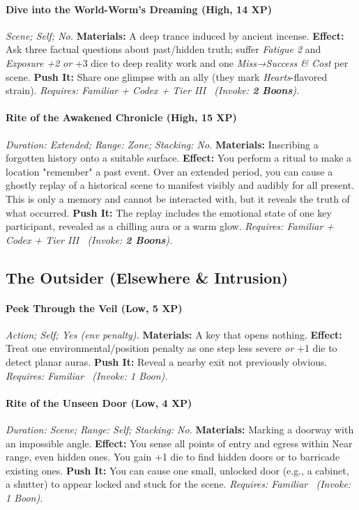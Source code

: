 \documentclass[12pt,twoside]{book}
\begin{document}
\paragraph{Dive into the World-Worm’s Dreaming (High, 14 XP)} \emph{Scene; Self; No.}
\textbf{Materials:} A deep trance induced by ancient incense.
\textbf{Effect:} Ask three factual questions about past/hidden truth; suffer \emph{Fatigue 2} and \emph{Exposure +2} \emph{or} +3 dice to deep reality work and one \emph{Miss→Success \& Cost} per scene.
\textbf{Push It:} Share one glimpse with an ally (they mark \emph{Hearts}-flavored strain).
\emph{Requires: Familiar + Codex + Tier III \ (\textit{Invoke:} \textbf{2 Boons}).}
\paragraph{Rite of the Awakened Chronicle (High, 15 XP)} \emph{Duration: Extended; Range: Zone; Stacking: No.}
\textbf{Materials:} Inscribing a forgotten history onto a suitable surface.
\textbf{Effect:} You perform a ritual to make a location "remember" a past event. Over an extended period, you can cause a ghostly replay of a historical scene to manifest visibly and audibly for all present. This is only a memory and cannot be interacted with, but it reveals the truth of what occurred.
\textbf{Push It:} The replay includes the emotional state of one key participant, revealed as a chilling aura or a warm glow.
\emph{Requires: Familiar + Codex + Tier III \ (\textit{Invoke:} \textbf{2 Boons}).}

\subsection{The Outsider (Elsewhere \& Intrusion)}
\paragraph{Peek Through the Veil (Low, 5 XP)} \emph{Action; Self; Yes (env penalty).}
\textbf{Materials:} A key that opens nothing.
\textbf{Effect:} Treat one environmental/position penalty as one step less severe \emph{or} +1 die to detect planar auras.
\textbf{Push It:} Reveal a nearby exit not previously obvious.
\emph{Requires: Familiar \ (\textit{Invoke:} 1 Boon).}
\paragraph{Rite of the Unseen Door (Low, 4 XP)} \emph{Duration: Scene; Range: Self; Stacking: No.}
\textbf{Materials:} Marking a doorway with an impossible angle.
\textbf{Effect:} You sense all points of entry and egress within Near range, even hidden ones. You gain +1 die to find hidden doors or to barricade existing ones.
\textbf{Push It:} You can cause one small, unlocked door (e.g., a cabinet, a shutter) to appear locked and stuck for the scene.
\emph{Requires: Familiar \ (\textit{Invoke:} 1 Boon).}
\end{document}
